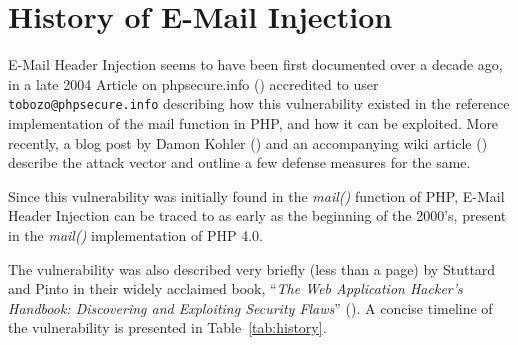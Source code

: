 \section{History of E-Mail Injection}

E-Mail Header Injection seems to have been first documented over a decade ago, in a late 2004 Article on phpsecure.info (\cite{Tobozo}) accredited to user \lstinline|tobozo@phpsecure.info| describing how this vulnerability existed in the reference implementation of the mail function in PHP, and how it can be exploited. More recently, a blog post by Damon Kohler (\cite{DK}) and an accompanying wiki article (\cite{Injection}) describe the attack vector and outline a few defense measures for the same.

Since this vulnerability was initially found in the \emph{mail()} function of PHP, E-Mail Header Injection can be traced to as early as the beginning of the 2000's, present in the \emph{mail()} implementation of PHP 4.0. 

The vulnerability was also described very briefly (less than a page) by Stuttard and Pinto in their widely acclaimed book, ``\emph{The Web Application Hacker's Handbook: Discovering and Exploiting Security Flaws}'' (\cite{stuttard2011web}). 
A concise timeline of the vulnerability is presented in Table~\ref{tab:history}.


